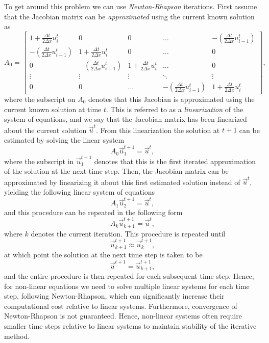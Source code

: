 To get around this problem we can use {\it Newton-Rhapson} iterations. First assume that the Jacobian matrix can be {\it approximated} using the current known solution as
\begin{equation}
	A_0 = 
	\begin{bmatrix}
	    1 + \frac{\Delta t}{2\Delta x}u_i^{t} & 0 & 0 & \dots  & - \left(\frac{\Delta t}{2\Delta x} u_{i-1}^{t}\right) \\
	    - \left(\frac{\Delta t}{2\Delta x} u_{i-1}^{t}\right) & 1 + \frac{\Delta t}{2\Delta x}u_i^{t} & 0 & \dots  & 0 \\
			0 & - \left(\frac{\Delta t}{2\Delta x} u_{i-1}^{t}\right) & 1 + \frac{\Delta t}{2\Delta x}u_i^{t} & \dots  & 0 \\
	    \vdots & \vdots & \vdots & \ddots & \vdots \\
	    0 & 0 & \dots & - \left(\frac{\Delta t}{2\Delta x} u_{i-1}^{t}\right)  & 1 + \frac{\Delta t}{2\Delta x}u_i^{t}
	\end{bmatrix},
\end{equation}
where the subscript on $A_0$ denotes that this Jacobian is approximated using the current known solution at time $t$. This is referred to as a {\it linearization} of the system of equations, and we say that the Jacobian matrix has been linearized about the current solution $\vec{u}^t$. From this linearization the solution at $t+1$ can be estimated by solving the linear system
\begin{equation}
	A_0 \vec{u}^{t+1}_1 = \vec{u}^t,
\end{equation}
where the subscript in $\vec{u}^{t+1}_1$ denotes that this is the first iterated approximation of the solution at the next time step. Then, the Jacobian matrix can be approximated by linearizing it about this first estimated solution instead of $\vec{u}^t$, yielding the following linear system of equations
\begin{equation}
	A_1 \vec{u}^{t+1}_2 = \vec{u}^t,
\end{equation}
and this procedure can be repeated in the following form
\begin{equation}
	A_k \vec{u}^{t+1}_{k+1} = \vec{u}^t,
\end{equation}
where $k$ denotes the current iteration. This procedure is repeated until
\begin{equation}
	\vec{u}^{t+1}_{k+1} \approx \vec{u}^{t+1}_{k},
\end{equation}
at which point the solution at the next time step is taken to be
\begin{equation}
	\vec{u}^{t+1} = \vec{u}^{t+1}_{k+1},
\end{equation}
and the entire procedure is then repeated for each subsequent time step. Hence, for non-linear equations we need to solve multiple linear systems for each time step, following Newton-Rhapson, which can significantly increase their computational cost relative to linear systems. Furthermore, convergence of Newton-Rhapson is not guaranteed. Hence, non-linear systems often require smaller time steps relative to linear systems to maintain stability of the iterative method.

